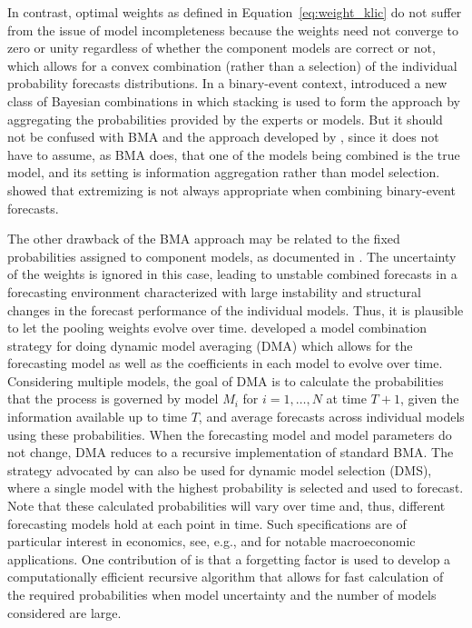 \documentclass[a4paper,11pt]{article}
\begin{document}
In contrast, optimal weights as defined in Equation~\eqref{eq:weight_klic} do not suffer from the issue of model incompleteness because the weights need not converge to zero or unity regardless of whether the component models are correct or not, which allows for a convex combination (rather than a selection) of the individual probability forecasts distributions. In a binary-event context, \citet{Lichtendahl2022-bi} introduced a new class of Bayesian combinations in which stacking is used to form the approach by aggregating the probabilities provided by the experts or models. But it should not be confused with BMA and the approach developed by \citet{Yao2018-st}, since it does not have to assume, as BMA does, that one of the models being combined is the true model, and its setting is information aggregation rather than model selection. \citet{Lichtendahl2022-bi} showed that extremizing \citep[i.e. shifting the average probability closer to its nearest extreme, see, e.g.,][]{Satopaa2016-mo} is not always appropriate when combining binary-event forecasts.

The other drawback of the BMA approach may be related to the fixed probabilities assigned to component models, as documented in \citet{Aastveit2019-lf}. The uncertainty of the weights is ignored in this case, leading to unstable combined forecasts in a forecasting environment characterized with large instability and structural changes in the forecast performance of the individual models. Thus, it is plausible to let the pooling weights evolve over time. \citet{Raftery2010-qe} developed a model combination strategy for doing dynamic model averaging (DMA) which allows for the forecasting model as well as the coefficients in each model to evolve over time. Considering multiple models, the goal of DMA is to calculate the probabilities that the process is governed by model $M_{i}$ for $i=1,\dots,N$ at time $T+1$, given the information available up to time $T$, and average forecasts across individual models using these probabilities. When the forecasting model and model parameters do not change, DMA reduces to a recursive implementation of standard BMA. The strategy advocated by \citet{Raftery2010-qe} can also be used for dynamic model selection (DMS), where a single model with the highest probability is selected and used to forecast. Note that these calculated probabilities will vary over time and, thus, different forecasting models hold at each point in time. Such specifications are of particular interest in economics, see, e.g., \citet{Koop2012-dma} and \citet{Del_Negro2016-ab} for notable macroeconomic applications. One contribution of \citet{Raftery2010-qe} is that a forgetting factor is used to develop a computationally efficient recursive algorithm that allows for fast calculation of the required probabilities when model uncertainty and the number of models considered are large.
\end{document}
